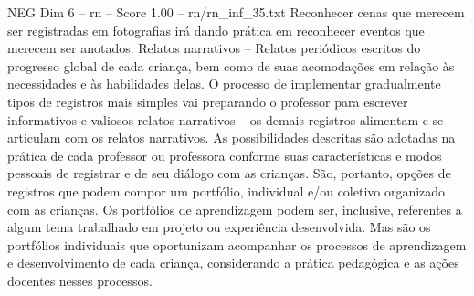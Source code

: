 \begin{textsample}{NEG Dim 6 – rn – Score 1.00 – rn/rn\_inf\_35.txt}
Reconhecer cenas que merecem ser registradas em fotografias irá dando prática em reconhecer eventos que merecem ser anotados.
Relatos narrativos – Relatos periódicos escritos do progresso global de cada criança, bem como de suas acomodações em relação às necessidades e às habilidades delas.
O processo de implementar gradualmente tipos de registros mais simples vai preparando o professor para escrever informativos e valiosos relatos narrativos – os demais registros alimentam e se articulam com os relatos narrativos.
As possibilidades descritas são adotadas na prática de cada professor ou professora conforme suas características e modos pessoais de registrar e de seu diálogo com as crianças.
São, portanto, opções de registros que podem compor um portfólio, individual e/ou coletivo organizado com as crianças.
Os portfólios de aprendizagem podem ser, inclusive, referentes a algum tema trabalhado em projeto ou experiência desenvolvida.
Mas são os portfólios individuais que oportunizam acompanhar os processos de aprendizagem e desenvolvimento de cada criança, considerando a prática pedagógica e as ações docentes nesses processos.

\end{textsample}
